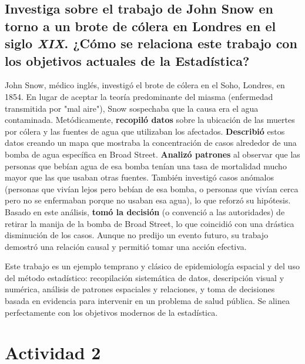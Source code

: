 \documentclass[12pt, letterpaper]{article}
\begin{document}
\subsection{Investiga sobre el trabajo de John Snow en torno a un brote de cólera en Londres en el siglo \textit{XIX}. ¿Cómo se relaciona este trabajo con los objetivos actuales de la Estadística?}
John Snow, médico inglés, investigó el brote de cólera en el Soho, Londres, en 1854. En lugar de aceptar la teoría predominante del miasma (enfermedad transmitida por "mal aire"), Snow sospechaba que la causa era el agua contaminada. Metódicamente, \textbf{recopiló datos} sobre la ubicación de las muertes por cólera y las fuentes de agua que utilizaban los afectados. \textbf{Describió} estos datos creando un mapa que mostraba la concentración de casos alrededor de una bomba de agua específica en Broad Street. \textbf{Analizó patrones} al observar que las personas que bebían agua de esa bomba tenían una tasa de mortalidad mucho mayor que las que usaban otras fuentes. También investigó casos anómalos (personas que vivían lejos pero bebían de esa bomba, o personas que vivían cerca pero no se enfermaban porque no usaban esa agua), lo que reforzó su hipótesis. Basado en este análisis, \textbf{tomó la decisión} (o convenció a las autoridades) de retirar la manija de la bomba de Broad Street, lo que coincidió con una drástica disminución de los casos. Aunque no predijo un evento futuro, su trabajo demostró una relación causal y permitió tomar una acción efectiva.

Este trabajo es un ejemplo temprano y clásico de epidemiología espacial y del uso del método estadístico: recopilación sistemática de datos, descripción visual y numérica, análisis de patrones espaciales y relaciones, y toma de decisiones basada en evidencia para intervenir en un problema de salud pública. Se alinea perfectamente con los objetivos modernos de la estadística.

\newpage
\section{Actividad 2}
\end{document}
